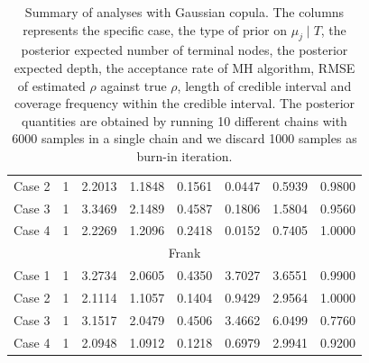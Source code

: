 \documentclass{amsart}
\begin{document}
\begin{table}[ht]
{\begin{tabular}{lc|cccccc}
		Case 2 & 1 & 2.2013 & 1.1848 & 0.1561 & 0.0447 & 0.5939 & 0.9800 \\ 
		Case 3 & 1 & 3.3469 & 2.1489 & 0.4587 & 0.1806 & 1.5804 & 0.9560 \\ 
		Case 4 & 1 & 2.2269 & 1.2096 & 0.2418 & 0.0152 & 0.7405 & 1.0000 \\ 
		\midrule
		\multicolumn{8}{c}{Frank} \\
		\midrule
		Case 1 & 1 & 3.2734 & 2.0605 & 0.4350 & 3.7027 & 3.6551 & 0.9900 \\ 
		Case 2 & 1 & 2.1114 & 1.1057 & 0.1404 & 0.9429 & 2.9564 & 1.0000 \\ 
		Case 3 & 1 & 3.1517 & 2.0479 & 0.4506 & 3.4662 & 6.0499 & 0.7760 \\ 
		Case 4 & 1 & 2.0948 & 1.0912 & 0.1218 & 0.6979 & 2.9941 & 0.9200 \\ 
		\bottomrule
		\end{tabular}}
	\caption{Summary of analyses with Gaussian copula. The columns represents the specific case, the type of prior on $\mu_j\mid T$, the posterior expected number of terminal nodes, the posterior expected depth, the acceptance rate of MH algorithm, RMSE of estimated $\rho$ against true $\rho$, length of credible interval and coverage frequency within the credible interval. The posterior quantities are obtained by running 10 different chains with 6000 samples in a single chain and we discard 1000 samples as burn-in iteration.}
	\label{tab:gauss:summary}
\end{table}
\end{document}

